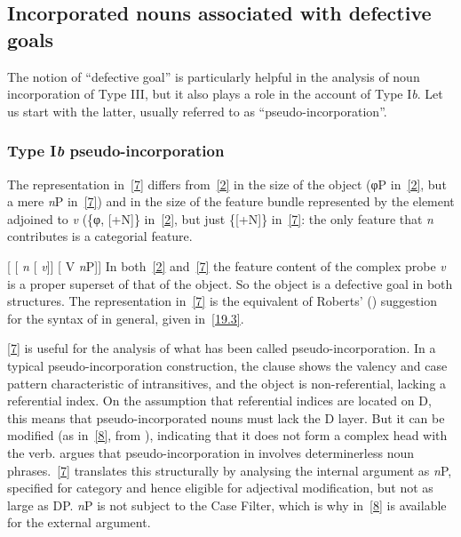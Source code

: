 \documentclass[output=paper]{langsci/langscibook}
\begin{document}
\begin{refcontext}
\subsection{Incorporated nouns associated with defective goals}
\label{2.1}

The notion of \enquote{defective goal} is particularly helpful in the analysis of
noun incorporation of Type III, but it also plays a role in the account of Type
I\emph{b}. Let us start with the latter, usually referred to as
\enquote{pseudo-incorporation}.

\subsubsection{Type I\emph{b} pseudo-incorporation}

The representation in~\eqref{7} differs from~\eqref{2} in the size of the
object (φ{}P in~\eqref{2}, but a mere \emph{n}P in~\eqref{7}) and in the size
of the feature bundle represented by the element adjoined to
\emph{v} (\{φ{}, [+N]\} in~\eqref{2}, but just \{[+N]\} in~\eqref{7}: the only
feature that \emph{n} contributes is a categorial feature.

\ea {}[ [ \emph{n}\tss{\{[+N]\}} [ \hspace{-1ex}\emph{v}\tss{\{[+V], \Acc{}, \ldots{}\}}]] [ V \emph{n}P\tss{\{[+N]\}}]] \label{7}
\z
In both~\eqref{2} and~\eqref{7} the feature content of the complex probe \emph{v}
is a proper superset of that of the object. So the object is a defective goal
in both structures. The representation in~\eqref{7} is the equivalent of Roberts'
(\citeyear{Roberts2010}) suggestion for the syntax of  in
general, given in~\eqref{19.3}.

\eqref{7} is useful for the analysis of what has been called
pseudo-incorporation. In a typical pseudo-incorporation construction, the
clause shows the valency and case pattern characteristic of intransitives, and
the object is non-referential, lacking a referential index. On the assumption
that referential indices are located on D, this means that pseudo-incorporated
nouns must lack the D layer. But it can be modified (as in~\eqref{8}, from
), indicating that it does not form a complex head with the verb.
\citet{massam01} argues that pseudo-incorporation in  involves
determinerless noun phrases.~\eqref{7} translates this structurally by analysing
the internal argument as \emph{n}P, specified for category and hence eligible
for adjectival modification, but not as large as DP. \emph{n}P is not subject
to the Case Filter, which is why in~\eqref{8}  is available for
the external argument.


\end{refcontext}
\end{document}
